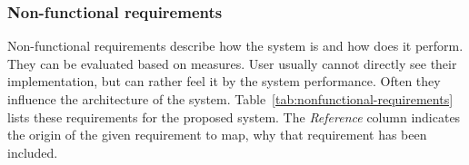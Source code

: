 \subsubsection{Non-functional requirements} \label{sec:analysis-nonfunctional}
Non-functional requirements describe how the system is and how does it perform. They can be evaluated based on measures. User usually cannot directly see their implementation, but can rather feel it by the system performance. Often they influence the architecture of the system. Table~\ref{tab:nonfunctional-requirements} lists these requirements for the proposed system. The \textit{Reference} column indicates the origin of the given requirement to map, why that requirement has been included.